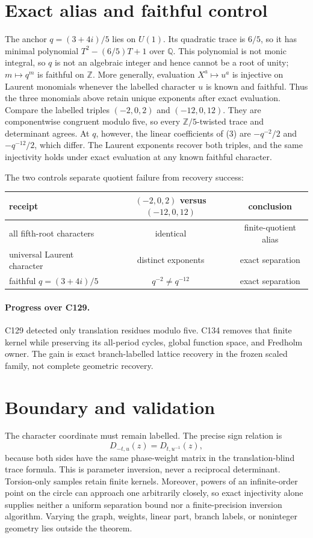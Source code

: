 \documentclass[10pt]{article}
\begin{document}
\section{Exact alias and faithful control}
The anchor $q=(3+4i)/5$ lies on $U(1)$.  Its quadratic trace is $6/5$, so it
has minimal polynomial $T^2-(6/5)T+1$ over $\mathbb Q$.  This polynomial is
not monic integral, so $q$ is not an algebraic integer and hence cannot be a
root of unity; $m\mapsto q^m$ is faithful on $\mathbb Z$.  More generally,
evaluation $X^a\mapsto u^a$ is injective on Laurent monomials whenever the
labelled character $u$ is known and faithful.  Thus the three monomials above
retain unique exponents after exact evaluation.  Compare the labelled triples
$(-2,0,2)$ and
$(-12,0,12)$.  They are componentwise congruent modulo five, so every
$\mathbb Z/5$-twisted trace and determinant agrees.  At $q$, however, the
linear coefficients of (3) are $-q^{-2}/2$ and $-q^{-12}/2$, which differ.
The Laurent exponents recover both triples, and the same injectivity holds
under exact evaluation at any known faithful character.

The two controls separate quotient failure from recovery success:
\begin{center}
\begin{tabular}{@{}lcc@{}}
\toprule
receipt & $(-2,0,2)$ versus $(-12,0,12)$ & conclusion\\
\midrule
all fifth-root characters & identical & finite-quotient alias\\
universal Laurent character & distinct exponents & exact separation\\
faithful $q=(3+4i)/5$ & $q^{-2}\ne q^{-12}$ & exact separation\\
\bottomrule
\end{tabular}
\end{center}

\paragraph{Progress over C129.}
C129 detected only translation residues modulo five.  C134 removes that
finite kernel while preserving its all-period cycles, global function space,
and Fredholm owner.  The gain is exact branch-labelled lattice recovery in
the frozen scaled family, not complete geometric recovery.

\section{Boundary and validation}
The character coordinate must remain labelled.  The precise sign relation is
\[
D_{-t,u}(z)=D_{t,u^{-1}}(z),
\]
because both sides have the same phase-weight matrix in the translation-blind
trace formula.  This is parameter inversion, never a reciprocal determinant.
Torsion-only samples retain finite kernels.  Moreover, powers of an
infinite-order point on the circle can approach one arbitrarily closely, so
exact injectivity alone supplies neither a uniform separation bound nor a
finite-precision inversion algorithm.  Varying the graph, weights, linear
part, branch labels, or noninteger geometry lies outside the theorem.
\end{document}
